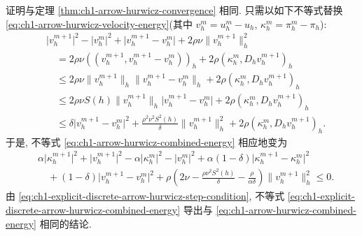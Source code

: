 证明与定理 \ref{thm:ch1-arrow-hurwicz-convergence} 相同. 只需以如下不等式替换 \eqref{eq:ch1-arrow-hurwicz-velocity-energy}(其中 $v_h^m=u_h^m-u_h$, $\kappa_h^m=\pi_h^m-\pi_h$):
\begin{equation}
\begin{aligned}
&\lvert v_h^{m+1}\rvert^2-\lvert v_h^m\rvert^2
+\lvert v_h^{m+1}-v_h^m\rvert
+2\rho\nu\lVert v_h^{m+1}\rVert_h^2\\
&\quad=2\rho\nu((v_h^{m+1},v_h^{m+1}-v_h^m))_h
+2\rho(\kappa_h^m,D_hv_h^{m+1})_h\\
&\quad\leq2\rho\nu\lVert v_h^{m+1}\rVert_h
\lVert v_h^{m+1}-v_h^m\rVert_h
+2\rho(\kappa_h^m,D_hv_h^{m+1})_h\\
&\quad\leq2\rho\nu S(h)\lVert v_h^{m+1}\rVert_h
\lvert v_h^{m+1}-v_h^m\rvert
+2\rho(\kappa_h^m,D_hv_h^{m+1})_h\\
&\quad\leq\delta\lvert v_h^{m+1}-v_h^m\rvert^2
+\frac{\rho^2\nu^2S^2(h)}{\delta}\lVert v_h^{m+1}\rVert_h^2
+2\rho(\kappa_h^m,D_hv_h^{m+1})_h.
\end{aligned}
\label{eq:ch1-explicit-discrete-arrow-hurwicz-velocity-energy}
\end{equation}
于是, 不等式 \eqref{eq:ch1-arrow-hurwicz-combined-energy} 相应地变为
\begin{equation}
\begin{aligned}
&\alpha\lvert\kappa_h^{m+1}\rvert^2+\lvert v_h^{m+1}\rvert^2
-\alpha\lvert\kappa_h^m\rvert^2-\lvert v_h^m\rvert^2
+\alpha(1-\delta)\lvert\kappa_h^{m+1}-\kappa_h^m\rvert^2\\
&\quad +(1-\delta)\lvert v_h^{m+1}-v_h^m\rvert^2
+\rho\left(2\nu-\frac{\rho\nu^2S^2(h)}{\delta}
-\frac{\rho}{\alpha\delta}\right)\lVert v_h^{m+1}\rVert_h^2\leq0.
\end{aligned}
\label{eq:ch1-explicit-discrete-arrow-hurwicz-combined-energy}
\end{equation}
由 \eqref{eq:ch1-explicit-discrete-arrow-hurwicz-step-condition}, 不等式 \eqref{eq:ch1-explicit-discrete-arrow-hurwicz-combined-energy} 导出与 \eqref{eq:ch1-arrow-hurwicz-combined-energy} 相同的结论.
